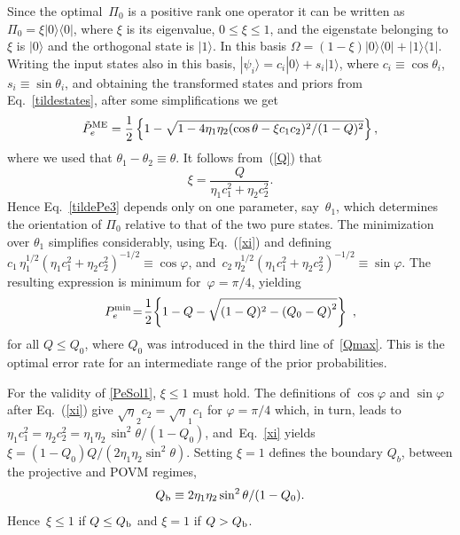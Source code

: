 \documentclass[aps,pra,twocolumn,eqsecnum,showpacs]{revtex4}
\begin{document}
Since the optimal~$\Pi_{0}$ is a positive rank one operator it can be written as $\Pi_0=\xi|0\rangle\langle0|$, where $\xi$ is its eigenvalue, $0\leq \xi \leq 1$, and the eigenstate belonging to $\xi$ is $|0\rangle$ and the orthogonal state is $|1\rangle$. In this basis $\Omega=(1-\xi)|0\rangle\langle0|+|1\rangle\langle1|$.
Writing the input states also in this basis, $|\psi_i\rangle=c_i|0\rangle+s_i|1\rangle$,
where $c_i\equiv\cos\theta_i$, $s_i\equiv\sin\theta_i$, and obtaining the transformed states and priors from Eq.~\eqref{tildestates}, after some simplifications we get
\begin{equation}
\tilde{P}^{\rm ME}_e=\frac{1}{2}\left\{1-\sqrt{1-4\eta_1\eta_2(\cos\theta-\xi c_1c_2)^2/(1-Q)^{2}} \right\} ,
\label{tildePe3}
\end{equation}
where we used that $\theta_{1} - \theta_{2} \equiv \theta$. It follows from~(\ref{Q}) that
%
\begin{equation}
\label{xi}
\xi=\frac{Q}{\eta_1c_1^2+\eta_2 c_2^2}.
\end{equation}
%
Hence Eq.~\eqref{tildePe3} depends only on one parameter, say~$\theta_1$, which determines the orientation of $\Pi_0$ relative
to that of the two pure states. The minimization over $\theta_1$ simplifies considerably, using Eq.~(\ref{xi}) and defining 
$ c_1\,\eta_1^{1/2}(\eta_1c_1^2+\eta_2c_2^2)^{-1/2}\equiv\cos\varphi$, and~$c_2\,\eta_2^{1/2}(\eta_1c_1^2+\eta_2c_2^2)^{-1/2}\equiv\sin\varphi$.
The resulting expression is minimum for~$\varphi=\pi/4$, yielding
%
\begin{equation}
P^{\rm min}_{e}\!=\!\frac{1}{2}\!\left\{1-Q - \sqrt{(1-Q)^2 - \left(Q_{0} - Q\right)^2}\right\} \ ,
\label{PeSol1}
\end{equation}
%
for all $Q \leq Q_{0}$, where $Q_0$ was introduced in the third line of~\eqref{Qmax}.
This is the optimal error rate for an intermediate range of the prior probabilities. 

For the validity of \eqref{PeSol1}, $\xi\le1$ must hold. 
The definitions of $\cos\varphi$ and $\sin\varphi$ after Eq.~(\ref{xi}) give
${\sqrt\eta_2 c_2=\sqrt\eta_1 c_1}$ for $\varphi=\pi/4$ which, in turn, leads to 
$\eta_1c_1^2=\eta_2c_2^2=\eta_1\eta_2\,{\sin^2\theta/( 1-Q_0)}$,
and~Eq.~\eqref{xi} yields $\xi=(1-Q_0)Q/(2\eta_1\eta_2\sin^2\theta)$.
Setting $\xi = 1$ defines the boundary $Q_{b}$, between the projective and POVM regimes, 
\begin{equation}
Q_{\rm b}\equiv {2\eta_1\eta_2\sin^2\theta/(1-Q_0)}.
\label{Qb}
\end{equation}
Hence~$\xi \leq 1$ if $Q \leq Q_{\rm b}$ and $\xi = 1$ if $Q > Q_{\rm b}$. 
\end{document}
